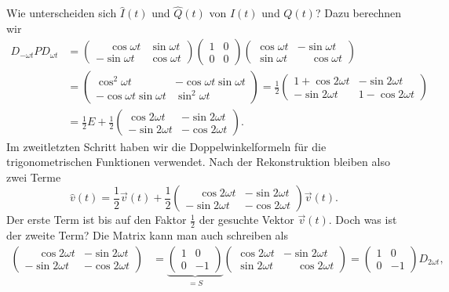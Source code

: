 Wie unterscheiden sich $\hat{I}(t)$ und $\hat{Q}(t)$ von $I(t)$ und $Q(t)$?
Dazu berechnen wir
\begin{align*}
D_{-\omega t}PD_{\omega t}
&=
\begin{pmatrix}
\phantom{-}\cos\omega t & \sin\omega t \\
         - \sin\omega t & \cos\omega t
\end{pmatrix}
\begin{pmatrix} 1 & 0 \\ 0 & 0 \end{pmatrix}
\begin{pmatrix}
\cos\omega t &          - \sin\omega t \\
\sin\omega t & \phantom{-}\cos\omega t
\end{pmatrix}
\\
&=
\begin{pmatrix}
 \cos^2\omega t           & -\cos\omega t \sin\omega t \\
-\cos\omega t \sin\omega t&\sin^2\omega t
\end{pmatrix}
=
\frac12
\begin{pmatrix}
1+\cos 2\omega t &  -\sin 2\omega t \\
 -\sin 2\omega t & 1-\cos 2\omega t
\end{pmatrix}
\\
&=
\frac12 E + \frac12
\begin{pmatrix}
 \cos 2\omega t & -\sin 2\omega t \\
-\sin 2\omega t & -\cos 2\omega t
\end{pmatrix}.
\end{align*}
Im zweitletzten Schritt haben wir die Doppelwinkelformeln für
die trigonometrischen Funktionen verwendet.
Nach der Rekonstruktion bleiben also zwei Terme
\[
\hat{v}(t)
=
\frac12\vec{v}(t)
+
\frac12
\begin{pmatrix}
\phantom{-}\cos 2\omega t & -\sin 2\omega t \\
         - \sin 2\omega t & -\cos 2\omega t
\end{pmatrix}\vec{v}(t).
\]
Der erste Term ist bis auf den Faktor $\frac12$ der gesuchte
Vektor $\vec{v}(t)$.
Doch was ist der zweite Term?
Die Matrix kann man auch schreiben als
\begin{align*}
\begin{pmatrix}
\phantom{-}\cos2\omega t&-\sin2\omega t\\
         - \sin2\omega t&-\cos2\omega t
\end{pmatrix}
&=
\underbrace{
\begin{pmatrix}
1& 0\\
0&-1
\end{pmatrix}}_{\displaystyle = S}
\begin{pmatrix}
\cos2\omega t &          - \sin2\omega t \\
\sin2\omega t & \phantom{-}\cos2\omega t
\end{pmatrix}
=
\begin{pmatrix}
1& 0\\
0&-1
\end{pmatrix}
D_{2\omega t},
\end{align*}
